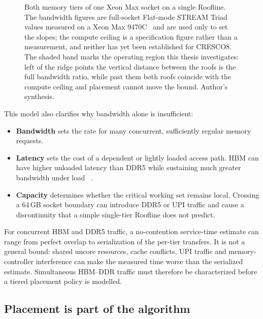 \begin{figure}[htbp]
\caption{Both memory tiers of one Xeon Max socket on a single Roofline.
The bandwidth figures are full-socket Flat-mode STREAM Triad values
measured on a Xeon Max 9470C~\cite{ibeid2025aurora} and are used only to
set the slopes; the compute ceiling is a specification figure rather
than a measurement, and neither has yet been established for CRESCO8.
The shaded band marks the operating region this thesis investigates:
left of the ridge points the vertical distance between the roofs is the
full bandwidth ratio, while past them both roofs coincide with the
compute ceiling and placement cannot move the bound.  Author's
synthesis.}
\label{fig:roofline}
\end{figure}


This model also clarifies why bandwidth alone is insufficient:

\begin{itemize}
  \item \textbf{Bandwidth} sets the rate for many concurrent,
        sufficiently regular memory requests.
  \item \textbf{Latency} sets the cost of a dependent or lightly loaded
        access path.  HBM can have higher unloaded latency than DDR5
        while sustaining much greater bandwidth under load
        ~\cite{ibeid2025aurora}.
  \item \textbf{Capacity} determines whether the critical working set
        remains local.  Crossing a 64\,GB socket boundary can introduce
        DDR5 or UPI traffic and cause a discontinuity that a simple
        single-tier Roofline does not predict.
\end{itemize}

For concurrent HBM and DDR5 traffic, a no-contention service-time
estimate can range from perfect overlap to serialization of the
per-tier transfers.  It is not a general bound: shared uncore resources,
cache conflicts, UPI traffic and memory-controller interference can make
the measured time worse than the serialized estimate.  Simultaneous
HBM--DDR traffic must therefore be characterized before a tiered
placement policy is modelled.

\subsection{Placement is part of the algorithm}

